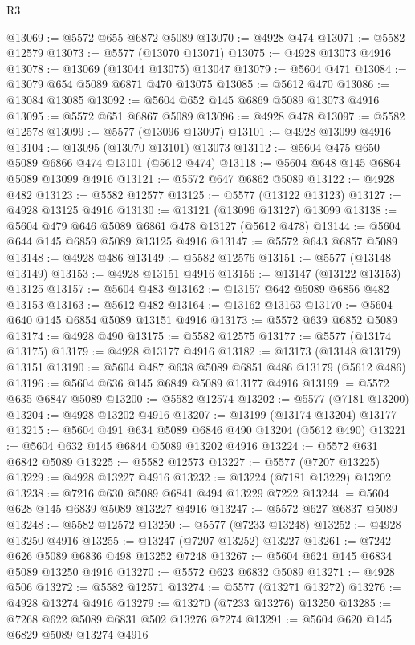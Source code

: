 \begin{lexlean}{R3}
\begin{coremodule}
@13069 := @5572 @655 @6872 @5089
@13070 := @4928 @474
@13071 := @5582 @12579
@13073 := @5577 (@13070 @13071)
@13075 := @4928 @13073 @4916
@13078 := @13069 (@13044 @13075) @13047
@13079 := @5604 @471
@13084 := @13079 @654 @5089 @6871 @470 @13075
@13085 := @5612 @470
@13086 := @13084 @13085
@13092 := @5604 @652 @145 @6869 @5089 @13073 @4916
@13095 := @5572 @651 @6867 @5089
@13096 := @4928 @478
@13097 := @5582 @12578
@13099 := @5577 (@13096 @13097)
@13101 := @4928 @13099 @4916
@13104 := @13095 (@13070 @13101) @13073
@13112 := @5604 @475 @650 @5089 @6866 @474 @13101 (@5612 @474)
@13118 := @5604 @648 @145 @6864 @5089 @13099 @4916
@13121 := @5572 @647 @6862 @5089
@13122 := @4928 @482
@13123 := @5582 @12577
@13125 := @5577 (@13122 @13123)
@13127 := @4928 @13125 @4916
@13130 := @13121 (@13096 @13127) @13099
@13138 := @5604 @479 @646 @5089 @6861 @478 @13127 (@5612 @478)
@13144 := @5604 @644 @145 @6859 @5089 @13125 @4916
@13147 := @5572 @643 @6857 @5089
@13148 := @4928 @486
@13149 := @5582 @12576
@13151 := @5577 (@13148 @13149)
@13153 := @4928 @13151 @4916
@13156 := @13147 (@13122 @13153) @13125
@13157 := @5604 @483
@13162 := @13157 @642 @5089 @6856 @482 @13153
@13163 := @5612 @482
@13164 := @13162 @13163
@13170 := @5604 @640 @145 @6854 @5089 @13151 @4916
@13173 := @5572 @639 @6852 @5089
@13174 := @4928 @490
@13175 := @5582 @12575
@13177 := @5577 (@13174 @13175)
@13179 := @4928 @13177 @4916
@13182 := @13173 (@13148 @13179) @13151
@13190 := @5604 @487 @638 @5089 @6851 @486 @13179 (@5612 @486)
@13196 := @5604 @636 @145 @6849 @5089 @13177 @4916
@13199 := @5572 @635 @6847 @5089
@13200 := @5582 @12574
@13202 := @5577 (@7181 @13200)
@13204 := @4928 @13202 @4916
@13207 := @13199 (@13174 @13204) @13177
@13215 := @5604 @491 @634 @5089 @6846 @490 @13204 (@5612 @490)
@13221 := @5604 @632 @145 @6844 @5089 @13202 @4916
@13224 := @5572 @631 @6842 @5089
@13225 := @5582 @12573
@13227 := @5577 (@7207 @13225)
@13229 := @4928 @13227 @4916
@13232 := @13224 (@7181 @13229) @13202
@13238 := @7216 @630 @5089 @6841 @494 @13229 @7222
@13244 := @5604 @628 @145 @6839 @5089 @13227 @4916
@13247 := @5572 @627 @6837 @5089
@13248 := @5582 @12572
@13250 := @5577 (@7233 @13248)
@13252 := @4928 @13250 @4916
@13255 := @13247 (@7207 @13252) @13227
@13261 := @7242 @626 @5089 @6836 @498 @13252 @7248
@13267 := @5604 @624 @145 @6834 @5089 @13250 @4916
@13270 := @5572 @623 @6832 @5089
@13271 := @4928 @506
@13272 := @5582 @12571
@13274 := @5577 (@13271 @13272)
@13276 := @4928 @13274 @4916
@13279 := @13270 (@7233 @13276) @13250
@13285 := @7268 @622 @5089 @6831 @502 @13276 @7274
@13291 := @5604 @620 @145 @6829 @5089 @13274 @4916

\end{coremodule}
\end{lexlean}
